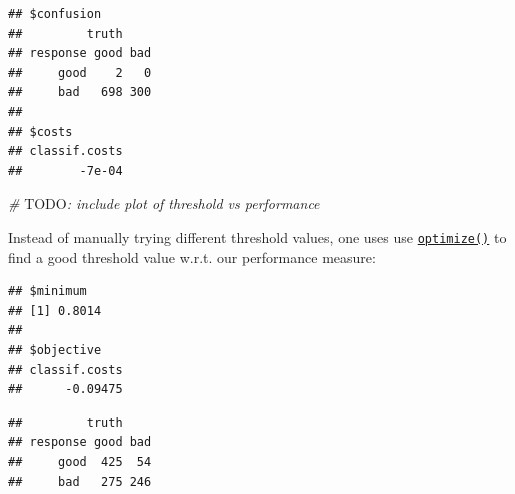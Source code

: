 \documentclass[]{scrbook}
\newenvironment{Shaded}{\begin{snugshade}}{\end{snugshade}}
\newcommand{\AlertTok}[1]{\textcolor[rgb]{0.94,0.16,0.16}{#1}}
\newcommand{\CommentTok}[1]{\textcolor[rgb]{0.56,0.35,0.01}{\textit{#1}}}
\newcommand{\ControlFlowTok}[1]{\textcolor[rgb]{0.13,0.29,0.53}{\textbf{#1}}}
\newcommand{\DecValTok}[1]{\textcolor[rgb]{0.00,0.00,0.81}{#1}}
\newcommand{\FloatTok}[1]{\textcolor[rgb]{0.00,0.00,0.81}{#1}}
\newcommand{\KeywordTok}[1]{\textcolor[rgb]{0.13,0.29,0.53}{\textbf{#1}}}
\newcommand{\NormalTok}[1]{#1}
\newcommand{\OperatorTok}[1]{\textcolor[rgb]{0.81,0.36,0.00}{\textbf{#1}}}
\newcommand{\StringTok}[1]{\textcolor[rgb]{0.31,0.60,0.02}{#1}}
\renewenvironment{Shaded} {\begin{snugshade}\small} {\end{snugshade}}
\begin{document}
\begin{verbatim}
## $confusion
##         truth
## response good bad
##     good    2   0
##     bad   698 300
## 
## $costs
## classif.costs 
##        -7e-04
\end{verbatim}

\begin{Shaded}
\begin{Highlighting}[]
\CommentTok{# }\AlertTok{TODO}\CommentTok{: include plot of threshold vs performance}
\end{Highlighting}
\end{Shaded}

Instead of manually trying different threshold values, one uses use \href{https://www.rdocumentation.org/packages/stats/topics/optimize}{\texttt{optimize()}} to find a good threshold value w.r.t. our performance measure:

\begin{Shaded}
\end{Shaded}

\begin{verbatim}
## $minimum
## [1] 0.8014
## 
## $objective
## classif.costs 
##      -0.09475
\end{verbatim}

\begin{Shaded}
\end{Shaded}

\begin{verbatim}
##         truth
## response good bad
##     good  425  54
##     bad   275 246
\end{verbatim}
\end{document}
